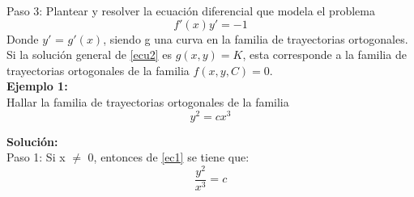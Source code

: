 \documentclass[12pt,letterpaper]{article}
\begin{document}
\begin{titlepage}
\begin{flushleft}
Paso 3: Plantear y resolver la ecuación diferencial que modela el problema 
\begin{equation} \tag{2} \label{ecu2}
f'(x)y' = -1
\end{equation}
Donde $y'$ \hspace{0.02cm} = \hspace{0.02cm} $g'(x)$, siendo g una curva en la familia de trayectorias ortogonales. \\
\vspace{0.4 cm}
Si la solución general de \eqref{ecu2} es $g(x,y) = K$, esta corresponde a la familia de trayectorias ortogonales de la familia $f(x,y,C) = 0$.\\

\vspace{0.5cm}
\textbf{Ejemplo 1:}\\
\vspace{0.5cm}
Hallar la familia de trayectorias ortogonales de la familia
\begin{equation} \tag{1} \label{ec1}
y^{2} = cx^{3}
\end{equation}

\textbf{Solución:} \\
\vspace{0.5cm}
 Paso 1: Si x $\neq$ 0, entonces de \eqref{ec1} se tiene que:
\begin{equation} \tag{2} \label{ec2}
\frac{y^{2}}{x^{3}} = c
\end{equation}


\end{flushleft}
\end{titlepage}
\end{document}
